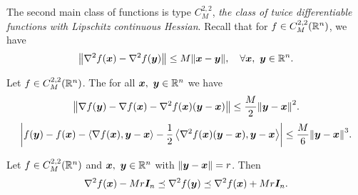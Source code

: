 The second main class of functions is type \(C^{2, 2}_M\), \emph{the class of twice differentiable functions with Lipschitz continuous Hessian}.
Recall that for \(f \in C^{2,2}_M(\mathbb{R}^n)\), we have
\[
    \norm{\hess f(\bm{x}) - \hess f(\bm{y})} \le M \norm{\bm{x} - \bm{y}}, \quad \forall \bm{x},~\bm{y} \in \R^n. 
\]

\begin{lemma}
    Let \(f \in C^{2,2}_M(\mathbb{R}^n)\). The for all \(\bm{x}, ~\bm{y} \in \mathbb{R}^n\) we have
    \begin{equation}\label{eq:C22M_1}
        \norm{\grad f(\bm{y}) - \grad f(\bm{x}) - \hess f(\bm{x})(\bm{y} -\bm{x})} \le \frac{M}{2} \norm{\bm{y} - \bm{x}}^2.
    \end{equation}
    \begin{equation}\label{eq:C22M_2}
        \abs{f(\bm{y}) - f(\bm{x}) - \innerprod{\grad f(\bm{x})}{\bm{y} - \bm{x}} - \frac{1}{2} \innerprod{\hess f(\bm{x})(\bm{y} -\bm{x})}{\bm{y} - \bm{x}}} \le \frac{M}{6} \norm{\bm{y} - \bm{x}}^3.
    \end{equation}
\end{lemma}

\begin{coro}
    Let \(f \in C^{2,2}_M(\mathbb{R}^n)\) and \(\bm{x},~\bm{y} \in \mathbb{R}^n\) with \(\norm{\bm{y} - \bm{x}} = r\). Then
    \[
        \hess f(\bm{x}) - Mr \bm{I}_n \preceq \hess f(\bm{y}) \preceq \hess f(\bm{x}) + Mr\bm{I}_n.  
    \]
\end{coro}